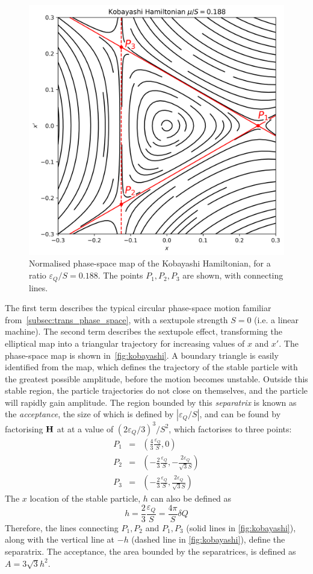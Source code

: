 \documentclass[a4paper,twoside,11pt]{report}
\begin{document}
\begin{figure}
  \centering
  \includegraphics[width=0.6\linewidth]{kobayashi.png}
  \caption[Phase-space map of the Kobayashi Hamiltonian]{Normalised phase-space map of the Kobayashi Hamiltonian, for a ratio ${\varepsilon_Q}/S=0.188$. The points $P_1, P_2, P_3$ are shown, with connecting lines.}\label{fig:kobayashi}
\end{figure}

The first term describes the typical circular phase-space motion familiar from~\autoref{subsec:trans_phase_space}, with a sextupole strength $S=0$ (i.e. a linear machine). The second term describes the sextupole effect, transforming the elliptical map into a triangular trajectory for increasing values of $x$ and $x'$. The phase-space map is shown in~\autoref{fig:kobayashi}. A boundary triangle is easily identified from the map, which defines the trajectory of the stable particle with the greatest possible amplitude, before the motion becomes unstable. Outside this stable region, the particle trajectories do not close on themselves, and the particle will rapidly gain amplitude. The region bounded by this \textit{separatrix} is known as the \textit{acceptance}, the size of which is defined by $|{\varepsilon_Q} /S|$, and can be found by factorising $\bf H$ at at a value of $(2{\varepsilon_Q} /3)^3/S^2$, which factorises to three points:
\begin{eqnarray}
  P_1 &=& \left(\frac 43 \frac{\varepsilon_Q} S,    0                       \right) \\
  P_2 &=& \left(-\frac 23 \frac {\varepsilon_Q} S,  -\frac{2{\varepsilon_Q}}{\sqrt 3 S} \right) \\
  P_3 &=& \left(-\frac 23 \frac {\varepsilon_Q} S,  \frac{2{\varepsilon_Q}}{\sqrt 3 S} \right)
\end{eqnarray}
The $x$ location of the stable particle, $h$ can also be defined as
\begin{equation}
  h=\frac 23 \frac {\varepsilon_Q} S = \frac{4\pi}S\delta Q
  \label{eq:apothem}
\end{equation}
Therefore, the lines connecting $P_1, P_2$ and $P_1, P_3$ (solid lines in \autoref{fig:kobayashi}), along with the vertical line at $-h$ (dashed line in \autoref{fig:kobayashi}), define the separatrix. The acceptance, the area bounded by the separatrices, is defined as $A=3\sqrt 3 h^2$.
\end{document}
